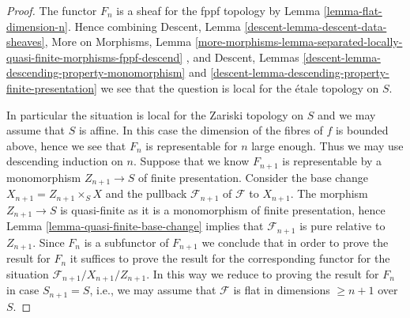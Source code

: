 \begin{proof}
The functor $F_n$ is a sheaf for the fppf topology by
Lemma \ref{lemma-flat-dimension-n}.
Hence combining
Descent, Lemma \ref{descent-lemma-descent-data-sheaves},
More on Morphisms, Lemma
\ref{more-morphisms-lemma-separated-locally-quasi-finite-morphisms-fppf-descend}
, and
Descent, Lemmas \ref{descent-lemma-descending-property-monomorphism} and
\ref{descent-lemma-descending-property-finite-presentation}
we see that the question is local for the \'etale topology on $S$.

\medskip\noindent
In particular the situation is local for the Zariski topology on $S$
and we may assume that $S$ is affine. In this case the dimension of the
fibres of $f$ is bounded above, hence we see that $F_n$ is representable
for $n$ large enough. Thus we may use descending induction on $n$.
Suppose that we know $F_{n + 1}$ is representable by a monomorphism
$Z_{n + 1} \to S$ of finite presentation. Consider the base change
$X_{n + 1} = Z_{n + 1} \times_S X$ and the pullback $\mathcal{F}_{n + 1}$
of $\mathcal{F}$ to $X_{n + 1}$. The morphism $Z_{n + 1} \to S$ is
quasi-finite as it is a monomorphism of finite presentation, hence
Lemma \ref{lemma-quasi-finite-base-change}
implies that $\mathcal{F}_{n + 1}$ is pure relative to $Z_{n + 1}$.
Since $F_n$ is a subfunctor of $F_{n + 1}$ we conclude that in order
to prove the result for $F_n$ it suffices to prove the result for the
corresponding functor for the situation
$\mathcal{F}_{n + 1}/X_{n + 1}/Z_{n + 1}$.
In this way we reduce to proving the result for $F_n$ in case
$S_{n + 1} = S$, i.e., we may assume that $\mathcal{F}$ is flat
in dimensions $\geq n + 1$ over $S$.


\end{proof}
